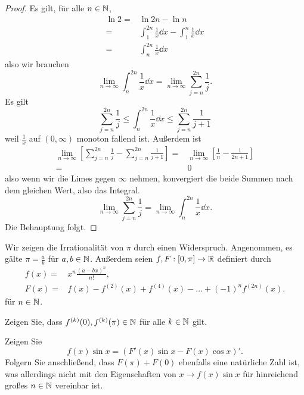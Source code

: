 \begin{proof}
	Es gilt, f\"{u}r alle $n\in \mathbb{N}$,
\begin{align*}
	\ln 2=&\ln 2n-\ln n\\
	=&\int_1^{2n} \frac{1}{x}\dd{x}-\int_1^n \frac{1}{x}\dd{x}\\
	=& \int_n^{2n}\frac{1}{x}\dd{x}
\end{align*}
also wir brauchen
\[
	\lim_{n \to \infty} \int_n^{2n}\frac{1}{x}\dd{x}=\lim_{n \to \infty} \sum_{j=n}^{2n}\frac{1}{j}
.\] 
Es gilt
\[
	\sum_{j=n}^{2n}\frac{1}{j}\le \int_n^{2n}\frac{1}{x}\dd{x}\le \sum_{j=n}^{2n} \frac{1}{j+1}
\]
weil $\frac{1}{x}$ auf $(0,\infty)$ monoton fallend ist. Außerdem ist
\begin{align*}
	\lim_{n \to \infty} \left[ \sum_{j=n}^{2n}\frac{1}{j}-\sum_{j=n}^{2n}\frac{1}{j+1} \right] =& \lim_{n \to \infty} \left[ \frac{1}{n}-\frac{1}{2n+1} \right] \\
	=& 0
\end{align*}
also wenn wir die Limes gegen $\infty$ nehmen, konvergiert die beide Summen nach dem gleichen Wert, also das Integral. 
\[
	\lim_{n \to \infty} \sum_{j=n}^{2n}\frac{1}{j}=\lim_{n \to \infty} \int_n^{2n}\frac{1}{x}\dd{x}
.\] 
Die Behauptung folgt.
\end{proof}
\begin{Problem}
	Wir zeigen die Irrationalität von $\pi$ durch einen Widerspruch. Angenommen, es gälte $\pi=\frac{a}{b}$ f\"{u}r $a,b\in \mathbb{N}$. Außerdem seien $f,F:[0,\pi]\to \mathbb{R}$ definiert durch
	\begin{align*}
		f(x)=&x^n\frac{(a-bx)^n}{n!},\\
		F(x)=&f(x)-f^{(2)}(x)+f^{(4)}(x)-\dots+(-1)^nf^{(2n)}(x).
	\end{align*}
	f\"{u}r $n\in \mathbb{N}$.
	\begin{parts}
	\item Zeigen Sie, dass $f^{(k)}(0),f^{(k)}(\pi)\in \mathbb{N}$ f\"{u}r alle $k\in \mathbb{N}$ gilt.
	\item Zeigen Sie
		\[
		f(x)\sin x=\left( F'(x)\sin x-F(x)\cos x \right)'
		.\] 
		Folgern Sie anschließend, dass $F(\pi)+F(0)$ ebenfalls eine natürliche Zahl ist, was allerdings nicht mit den Eigenschaften von $x\to f(x)\sin x$ f\"{u}r hinreichend großes $n\in \mathbb{N}$ vereinbar ist. 
	\end{parts}
\end{Problem}
